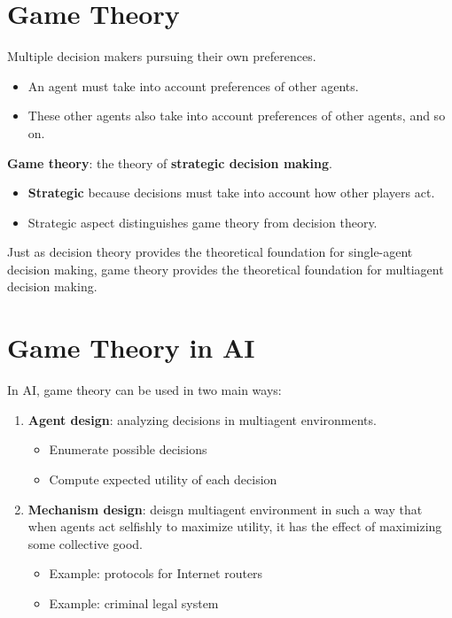 \documentclass[11pt]{article}
\begin{document}
\section{Game Theory}
\label{sec:orgd0cc9be}

Multiple decision makers pursuing their own preferences.

\begin{itemize}
\item An agent must take into account preferences of other agents.
\item These other agents also take into account preferences of other agents, and so on.
\end{itemize}

\textbf{Game theory}: the theory of \textbf{strategic decision making}.

\begin{itemize}
\item \textbf{Strategic} because decisions must take into account how other players act.
\item Strategic aspect distinguishes game theory from decision theory.
\end{itemize}

Just as decision theory provides the theoretical foundation for single-agent decision making, game theory provides the theoretical foundation for multiagent decision making.
\section{Game Theory in AI}
\label{sec:org92fad95}

In AI, game theory can be used in two main ways:

\begin{enumerate}
\item \textbf{Agent design}: analyzing decisions in multiagent environments.

\begin{itemize}
\item Enumerate possible decisions
\item Compute expected utility of each decision
\end{itemize}

\item \textbf{Mechanism design}: deisgn multiagent environment in such a way that when agents act selfishly to maximize utility, it has the effect of maximizing some collective good.

\begin{itemize}
\item Example: protocols for Internet routers
\item Example: criminal legal system
\end{itemize}
\end{enumerate}
\end{document}
